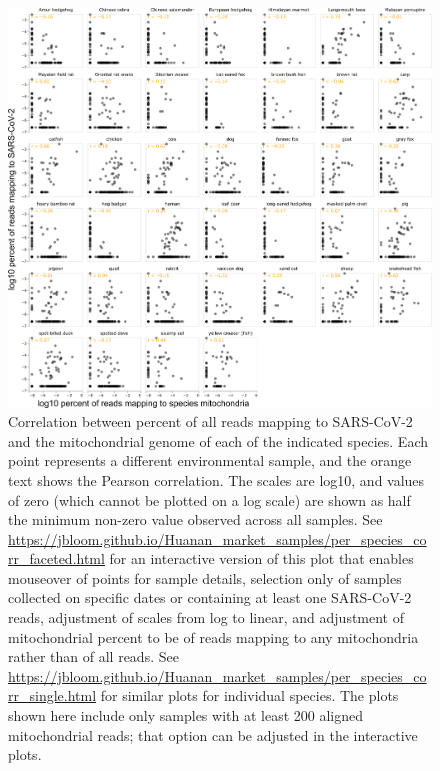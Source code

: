 \documentclass[9pt,twocolumn,twoside]{gsajnl_modified}
\begin{document}
\begin{figure}
\includegraphics[width=\linewidth]{fig3.png}
\caption{
Correlation between percent of all reads mapping to SARS-CoV-2 and the mitochondrial genome of each of the indicated species.
Each point represents a different environmental sample, and the orange text shows the Pearson correlation.
The scales are log10, and values of zero (which cannot be plotted on a log scale) are shown as half the minimum non-zero value observed across all samples.
See \url{https://jbloom.github.io/Huanan_market_samples/per_species_corr_faceted.html} for an interactive version of this plot that enables mouseover of points for sample details, selection only of samples collected on specific dates or containing at least one SARS-CoV-2 reads, adjustment of scales from log to linear, and adjustment of mitochondrial percent to be of reads mapping to any mitochondria rather than of all reads.
See \url{https://jbloom.github.io/Huanan_market_samples/per_species_corr_single.html} for similar plots for individual species.
The plots shown here include only samples with at least 200 aligned mitochondrial reads; that option can be adjusted in the interactive plots.
\label{fig:per_species_corr_faceted}
}
\end{figure}
\end{document}
